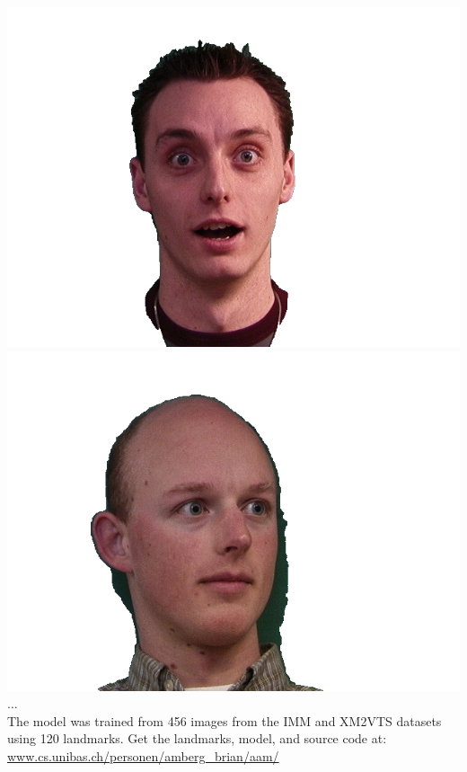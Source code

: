 \documentclass[landscape,a0paper,fontscale=0.292]{baposter}
\begin{document}
\begin{poster}
{   \includegraphics[width=0.2\linewidth]{09_6m_masked}%
   \includegraphics[width=0.2\linewidth]{33_4m_masked}%
   $\dots$\\
   The model was trained from 456 images from the IMM and XM2VTS datasets using
   120 landmarks. Get the landmarks, model, and source code at:\\
   \mbox{\url{www.cs.unibas.ch/personen/amberg_brian/aam/}}
   }



\end{poster}
\end{document}
